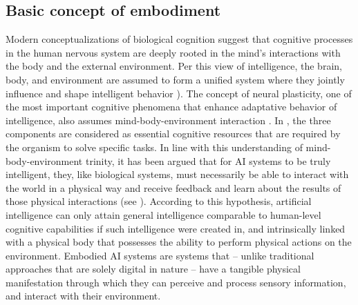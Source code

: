 \documentclass[10pt,journal,compsoc]{IEEEtran}
\begin{document}
	\subsection{Basic concept of embodiment}
	Modern conceptualizations of biological cognition suggest that cognitive processes in the human nervous system are deeply rooted in the mind’s interactions with the body and the external environment. Per this view of intelligence, the brain, body, and environment are assumed to form a unified system where they jointly influence and shape intelligent behavior \cite{mougenot2024theoretical,wilson2013embodied,tibbetts2014does,foglia2013embodied}). The concept of neural plasticity, one of the most important cognitive phenomena that enhance adaptative behavior of intelligence, also assumes mind-body-environment interaction \cite{hsu2024entangled,thoenen1995neurotrophins,huttenlocher2009neural}. In \cite{wilson2013embodied}, the three components are considered as essential cognitive resources that are required by the organism to solve specific tasks. 
	In line with this understanding of mind-body-environment trinity, it has been argued that for AI systems to be truly intelligent, they, like biological systems, must necessarily be able to interact with the world in a physical way and receive feedback and learn about the results of those physical interactions (see \cite{pfeifer2004embodied,sharkey2001mechanistic,savva2019habitat,mecattaf2024little,liu2024aligning,zhang2023large}). According to this hypothesis, artificial intelligence can only attain general intelligence comparable to human-level cognitive capabilities if such intelligence were created in, and intrinsically linked with a physical body that possesses the ability to perform physical actions on the environment\cite{liu2024aligning,duan2022survey,lee2006physically}. Embodied AI systems are systems that – unlike traditional approaches that are solely digital in nature – have a tangible physical manifestation through which they can perceive and process sensory information, and interact with their environment. 
	
\end{document}
